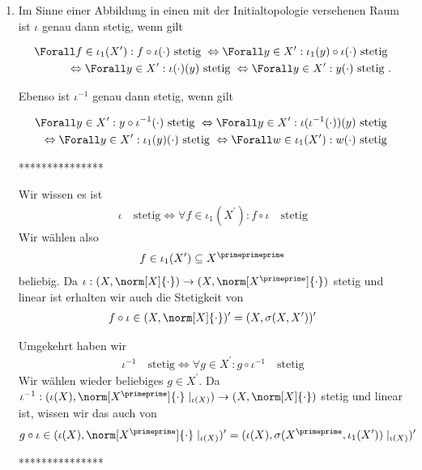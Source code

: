 \begin{solution}
\begin{enumerate}[label = (\arabic*)]
  ***************

  \item

  Im Sinne einer Abbildung in einen mit der Initialtopologie versehenen Raum ist $\iota$ genau dann stetig, wenn gilt

  \begin{align*}
    \Forall f \in \iota_1(X^{\prime}): f \circ \iota(\cdot) \text{~stetig~} \Leftrightarrow \Forall y \in X^{\prime}: \iota_1 (y) \circ \iota(\cdot) \text{~stetig~} \\
     \Leftrightarrow \Forall y \in X^{\prime}: \iota(\cdot)(y) \text{~stetig~} \Leftrightarrow \Forall y \in X^{\prime}: y(\cdot) \text{~stetig~}.
  \end{align*}

  Ebenso ist $\iota^{-1}$ genau dann stetig, wenn gilt

  \begin{align*}
    \Forall y \in X^{\prime}: y \circ \iota^{-1}(\cdot) \text{~stetig~} \Leftrightarrow \Forall y \in X^{\prime}: \iota(\iota^{-1}(\cdot))(y) \text{~stetig~} \\
     \Leftrightarrow \Forall y \in X^{\prime}: \iota_1(y)(\cdot) \text{~stetig~} \Leftrightarrow \Forall w \in \iota_1(X^{\prime}): w(\cdot) \text{~stetig~}
  \end{align*}

  ***************

  Wir wissen es ist
  \begin{align*}
    \iota \quad \textrm{stetig} \Leftrightarrow \forall f \in \iota_1(X^\prime): f \circ \iota \quad \textrm{stetig}
  \end{align*}
  Wir wählen also
  \begin{align*}
    f \in \iota_1(X^\prime) \subseteq X^\primeprimeprime
  \end{align*}
  beliebig. Da $\iota: (X, \norm[X]{\cdot}) \to (X, \norm[X^\primeprime]{\cdot})$ stetig und linear ist erhalten wir auch die Stetigkeit von
  \begin{align*}
    f \circ \iota \in (X, \norm[X]{\cdot})^\prime = (X, \sigma(X, X^\prime))^\prime
  \end{align*}

  Umgekehrt haben wir
  \begin{align*}
    \iota^{-1} \quad \textrm{stetig} \Leftrightarrow \forall g \in X^{\prime}: g \circ \iota^{-1} \quad \textrm{stetig}
  \end{align*}
  Wir wählen wieder beliebiges $g \in X^\prime$. Da $\iota^{-1}: (\iota(X), \norm[X^\primeprime]{\cdot}\mid_{\iota(X)}) \to (X, \norm[X]{\cdot})$ stetig und linear ist, wissen wir das auch von
  \begin{align*}
    g \circ \iota \in (\iota(X), \norm[X^\primeprime]{\cdot}\mid_{\iota(X)})^\prime = (\iota(X), \sigma(X^\primeprime, \iota_1(X^\prime))\mid_{\iota(X)})^\prime
  \end{align*}

  ***************

\end{enumerate}


\end{solution}
